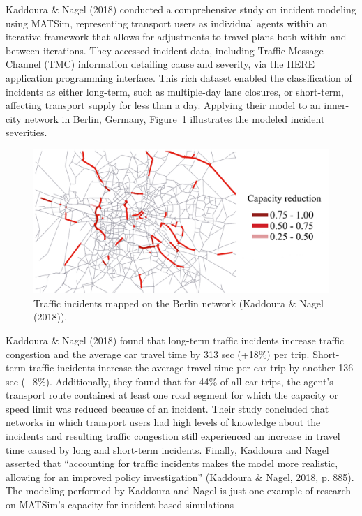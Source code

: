 \documentclass[fancy, oneside, mastersfancy, ms]{byuthesis}
\begin{document}
Kaddoura \& Nagel (2018) conducted a comprehensive study on incident
modeling using MATSim, representing transport users as individual agents
within an iterative framework that allows for adjustments to travel
plans both within and between iterations. They accessed incident data,
including Traffic Message Channel (TMC) information detailing cause and
severity, via the HERE application programming interface. This rich
dataset enabled the classification of incidents as either long-term,
such as multiple-day lane closures, or short-term, affecting transport
supply for less than a day. Applying their model to an inner-city
network in Berlin, Germany, Figure~\ref{fig-berlin_cap} illustrates the
modeled incident severities.

\begin{figure}

{\centering \includegraphics{figures/berlin_capacity.png}

}

\caption{\label{fig-berlin_cap}Traffic incidents mapped on the Berlin
network (Kaddoura \& Nagel (2018)).}

\end{figure}

Kaddoura \& Nagel (2018) found that long-term traffic incidents increase
traffic congestion and the average car travel time by 313 sec (+18\%)
per trip. Short-term traffic incidents increase the average travel time
per car trip by another 136 sec (+8\%). Additionally, they found that
for 44\% of all car trips, the agent's transport route contained at
least one road segment for which the capacity or speed limit was reduced
because of an incident. Their study concluded that networks in which
transport users had high levels of knowledge about the incidents and
resulting traffic congestion still experienced an increase in travel
time caused by long and short-term incidents. Finally, Kaddoura and
Nagel asserted that ``accounting for traffic incidents makes the model
more realistic, allowing for an improved policy investigation''
(Kaddoura \& Nagel, 2018, p. 885). The modeling performed by Kaddoura
and Nagel is just one example of research on MATSim's capacity for
incident-based simulations
\end{document}
